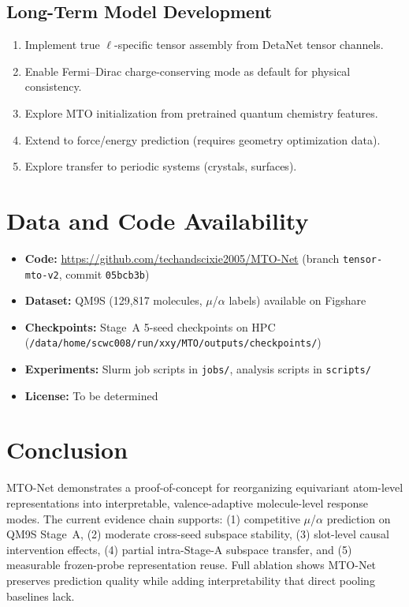 \documentclass[11pt,a4paper]{article}
\begin{document}
\subsection{Long-Term Model Development}
\begin{enumerate}[nosep]
    \item Implement true $\ell$-specific tensor assembly from DetaNet tensor channels.
    \item Enable Fermi--Dirac charge-conserving mode as default for physical consistency.
    \item Explore MTO initialization from pretrained quantum chemistry features.
    \item Extend to force/energy prediction (requires geometry optimization data).
    \item Explore transfer to periodic systems (crystals, surfaces).
\end{enumerate}

\section{Data and Code Availability}

\begin{itemize}[nosep]
    \item \textbf{Code:} \url{https://github.com/techandscixie2005/MTO-Net} (branch \texttt{tensor-mto-v2}, commit \texttt{05bcb3b})
    \item \textbf{Dataset:} QM9S (129,817 molecules, $\mu$/$\alpha$ labels) available on Figshare
    \item \textbf{Checkpoints:} Stage~A 5-seed checkpoints on HPC (\texttt{/data/home/scwc008/run/xxy/MTO/outputs/checkpoints/})
    \item \textbf{Experiments:} Slurm job scripts in \texttt{jobs/}, analysis scripts in \texttt{scripts/}
    \item \textbf{License:} To be determined
\end{itemize}

\section{Conclusion}

MTO-Net demonstrates a proof-of-concept for reorganizing equivariant atom-level representations into interpretable, valence-adaptive molecule-level response modes. The current evidence chain supports: (1) competitive $\mu$/$\alpha$ prediction on QM9S Stage~A, (2) moderate cross-seed subspace stability, (3) slot-level causal intervention effects, (4) partial intra-Stage-A subspace transfer, and (5) measurable frozen-probe representation reuse. Full ablation shows MTO-Net preserves prediction quality while adding interpretability that direct pooling baselines lack.
\end{document}

